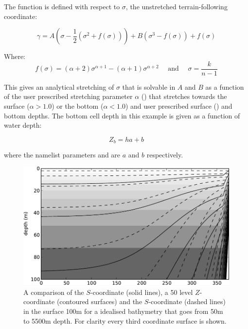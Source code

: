 {The function is defined with respect to $\sigma$, the unstretched terrain-following coordinate:

\begin{equation} \label{DOM_gamma_deriv}
\gamma= A\left(\sigma-\frac{1}{2}\left(\sigma^{2}+f\left(\sigma\right)\right)\right)+B\left(\sigma^{3}-f\left(\sigma\right)\right)+f\left(\sigma\right)
\end{equation}

Where:
\begin{equation} \label{DOM_gamma}
f\left(\sigma\right)=\left(\alpha+2\right)\sigma^{\alpha+1}-\left(\alpha+1\right)\sigma^{\alpha+2} \quad \text{ and } \quad \sigma = \frac{k}{n-1} 
\end{equation}

This gives an analytical stretching of $\sigma$ that is solvable in $A$ and $B$ as a function of the user prescribed stretching parameter $\alpha$ () that stretches towards the surface ($\alpha > 1.0$) or the bottom ($\alpha < 1.0$) and user prescribed surface () and bottom depths. The bottom cell depth in this example is given as a function of water depth:

\begin{equation} \label{DOM_zb}
Z_b= h a + b
\end{equation}

where the namelist parameters  and  are $a$ and $b$ respectively.

\begin{figure}[!ht]
   \includegraphics[width=1.0\textwidth]{./TexFiles/Figures/FIG_DOM_compare_coordinates_surface.pdf}
        \caption{A comparison of the \citet{Song_Haidvogel_JCP94} $S$-coordinate (solid lines), a 50 level $Z$-coordinate (contoured surfaces) and the \citet{Siddorn_Furner_OM12} $S$-coordinate (dashed lines) in the surface 100m for a idealised bathymetry that goes from 50m to 5500m depth. For clarity every third coordinate surface is shown.}
    \label{fig_compare_coordinates_surface}
\end{figure}

}
